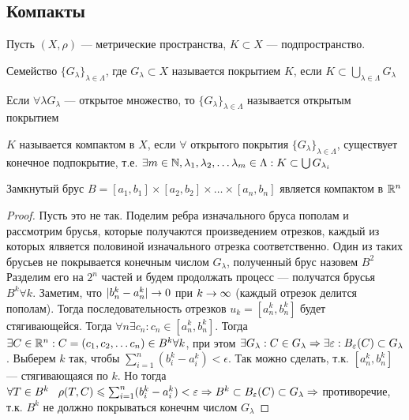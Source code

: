 
\subsection{Компакты}

Пусть \((X, \rho)\) --- метрические пространства, \(K \subset X\) --- подпространство.

\begin{definition}
    Семейство \(\{G_\lambda\}_{\lambda\in\Lambda}\), где \(G_\lambda \subset X\) называется покрытием \(K\), если \(K \subset \bigcup_{\lambda\in\Lambda}G_\lambda\)
\end{definition}
\begin{definition}
    Если \(\forall \lambda G_\lambda\) --- открытое множество, то \(\{G_\lambda\}_{\lambda\in\Lambda}\) называется открытым покрытием
\end{definition}

\begin{definition}
    \(K\) называется компактом в \(X\), если \(\forall\) открытого покрытия \(\{G_\lambda\}_{\lambda\in\Lambda}\), существует конечное подпокрытие, т.е. \(\exists m \in \mathbb{N}, \lambda_1, \lambda_2, \dots \lambda_m \in \Lambda: K \subset \bigcup G_{\lambda_i}\)
\end{definition}

\begin{example}
    Замкнутый брус \(B = [a_1, b_1]\times [a_2, b_2] \times \dots \times [a_n, b_n]\) является компактом в \(\mathbb{R}^n\)
\end{example}
\begin{proof}
    Пусть это не так. Поделим ребра изначального бруса пополам и рассмотрим брусья, которые получаются произведением отрезков, каждый из которых ялвяется половиной изначального отрезка соответственно. Один из таких брусьев не покрывается конечным числом \(G_\lambda\), полученный брус назовем \(B^2\) Разделим его на \(2^n\) частей и будем продолжать процесс --- получатся брусья \(B^k \forall k\). Заметим, что \(|b_n^k - a_n^k| \rightarrow 0\) при \(k \rightarrow \infty\) (каждый отрезок делится пополам). Тогда последовательность отрезков \(u_k = [a_n^k, b_n^k]\) будет стягивающейся. Тогда \(\forall n \exists c_n: c_n \in [a_n^k, b_n^k]\). Тогда \(\exists C \in \mathbb{R}^n: C = (c_1, c_2, \dots c_n) \in B^k \forall k\), при этом \(\exists G_\lambda: C \in G_\lambda \Rightarrow \exists \varepsilon: B_{\varepsilon}(C) \subset G_\lambda\). Выберем \(k\) так, чтобы \(\sum_{i = 1}^n (b_i^k - a_i^k) < \epsilon\). Так можно сделать, т.к. \([a_n^k, b_n^k]\) --- стягивающаяся по \(k\). Но тогда \(\forall T \in B^k\;\;\;\rho(T, C) \leqslant \sum_{i = 1}^n (b_i^k - a_i^k) < \varepsilon \Rightarrow B^k \subset B_{\varepsilon}(C) \subset G_\lambda \Rightarrow\) противоречие, т.к. \(B^k\) не должно покрываться конечнм числом \(G_\lambda\)
\end{proof}

